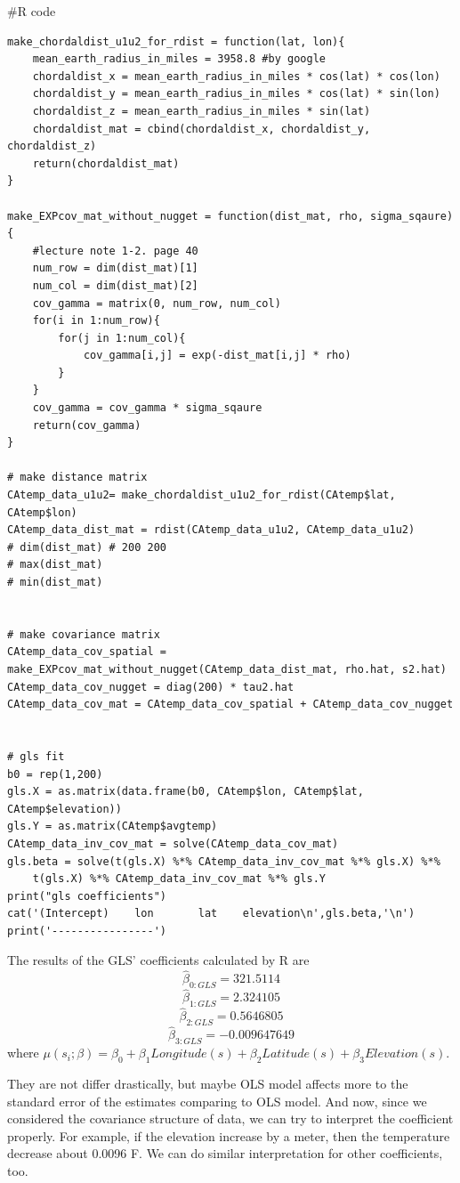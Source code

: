 \documentclass{article}
\newenvironment{Rcode}%
{%
    \begin{mdframed}
    \#R code
    \begin{small}
}
{%
    \end{small}
    \end{mdframed}
}
\begin{document}
\begin{Rcode}
    \begin{verbatim}
make_chordaldist_u1u2_for_rdist = function(lat, lon){
    mean_earth_radius_in_miles = 3958.8 #by google
    chordaldist_x = mean_earth_radius_in_miles * cos(lat) * cos(lon)
    chordaldist_y = mean_earth_radius_in_miles * cos(lat) * sin(lon)
    chordaldist_z = mean_earth_radius_in_miles * sin(lat)
    chordaldist_mat = cbind(chordaldist_x, chordaldist_y, chordaldist_z)
    return(chordaldist_mat)
}
    
make_EXPcov_mat_without_nugget = function(dist_mat, rho, sigma_sqaure){
    #lecture note 1-2. page 40
    num_row = dim(dist_mat)[1] 
    num_col = dim(dist_mat)[2]
    cov_gamma = matrix(0, num_row, num_col)
    for(i in 1:num_row){
        for(j in 1:num_col){
            cov_gamma[i,j] = exp(-dist_mat[i,j] * rho)
        }
    }
    cov_gamma = cov_gamma * sigma_sqaure
    return(cov_gamma)
}
    
# make distance matrix
CAtemp_data_u1u2= make_chordaldist_u1u2_for_rdist(CAtemp$lat, CAtemp$lon)
CAtemp_data_dist_mat = rdist(CAtemp_data_u1u2, CAtemp_data_u1u2)
# dim(dist_mat) # 200 200
# max(dist_mat)
# min(dist_mat)


# make covariance matrix
CAtemp_data_cov_spatial = make_EXPcov_mat_without_nugget(CAtemp_data_dist_mat, rho.hat, s2.hat)
CAtemp_data_cov_nugget = diag(200) * tau2.hat
CAtemp_data_cov_mat = CAtemp_data_cov_spatial + CAtemp_data_cov_nugget


# gls fit
b0 = rep(1,200)
gls.X = as.matrix(data.frame(b0, CAtemp$lon, CAtemp$lat, CAtemp$elevation))
gls.Y = as.matrix(CAtemp$avgtemp)
CAtemp_data_inv_cov_mat = solve(CAtemp_data_cov_mat)
gls.beta = solve(t(gls.X) %*% CAtemp_data_inv_cov_mat %*% gls.X) %*% 
    t(gls.X) %*% CAtemp_data_inv_cov_mat %*% gls.Y
print("gls coefficients")
cat('(Intercept)    lon       lat    elevation\n',gls.beta,'\n')
print('----------------')
    \end{verbatim}
\end{Rcode}

The results of the GLS' coefficients calculated by R are
\[\hat{\beta}_{0:GLS}=321.5114\]
\[\hat{\beta}_{1:GLS}=2.324105\]
\[\hat{\beta}_{2:GLS}=0.5646805\]
\[\hat{\beta}_{3:GLS}=-0.009647649\]
where \(\mu(s_i;\beta)=\beta_0+\beta_1 Longitude(s) + \beta_2 Latitude(s)+\beta_3 Elevation(s)\).

They are not differ drastically, but maybe OLS model affects more to the standard error of the estimates comparing to OLS model.
And now, since we considered the covariance structure of data,
we can try to interpret the coefficient properly. 
For example, if the elevation increase by a meter, then the temperature decrease about 0.0096 F.
We can do similar interpretation for other coefficients, too.
\end{document}
